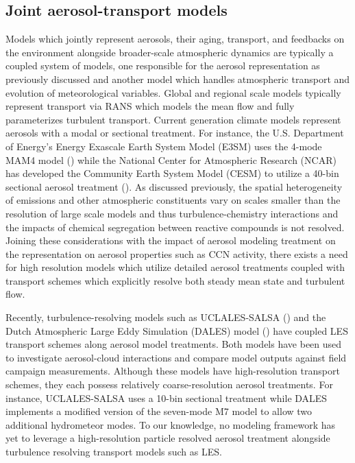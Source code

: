 \subsection{Joint aerosol-transport models}
Models which jointly represent aerosols, their aging, transport, and feedbacks on the environment alongside broader-scale atmospheric dynamics are typically a coupled system of models, one responsible for the aerosol representation as previously discussed and another model which handles atmospheric transport and evolution of meteorological variables. Global and regional scale models typically represent transport via RANS which models the mean flow and fully parameterizes turbulent transport. Current generation climate models represent aerosols with a modal or sectional treatment. For instance, the U.S. Department of Energy's Energy Exascale Earth System Model (E3SM) uses the 4-mode MAM4 model (\cite{golaz_doe_2022}) while the National Center for Atmospheric Research (NCAR) has developed the Community Earth System Model (CESM) to utilize a 40-bin sectional aerosol treatment (\cite{tilmes_description_2023}). As discussed previously, the spatial heterogeneity of emissions and other atmospheric constituents vary on scales smaller than the resolution of large scale models and thus turbulence-chemistry interactions and the impacts of chemical segregation between reactive compounds is not resolved. Joining these considerations with the impact of aerosol modeling treatment on the representation on aerosol properties such as CCN activity, there exists a need for high resolution models which utilize detailed aerosol treatments coupled with transport schemes which explicitly resolve both steady mean state and turbulent flow.

Recently, turbulence-resolving models such as UCLALES-SALSA (\cite{tonttila_uclalessalsa_2017}) and the Dutch Atmospheric Large Eddy Simulation (DALES) model (\cite{de_bruine_explicit_2019}) have coupled LES transport schemes along aerosol model treatments. Both models have been used to investigate aerosol-cloud interactions and compare model outputs against field campaign measurements. Although these models have high-resolution transport schemes, they each possess relatively coarse-resolution aerosol treatments. For instance, UCLALES-SALSA uses a 10-bin sectional treatment while DALES implements a modified version of the seven-mode M7 model to allow two additional hydrometeor modes. To our knowledge, no modeling framework has yet to leverage a high-resolution particle resolved aerosol treatment alongside turbulence resolving transport models such as LES. 

